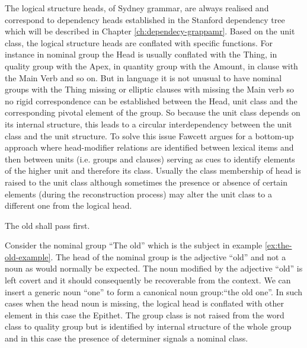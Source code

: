 The logical structure heads, of Sydney grammar, are always realised and correspond to dependency heads established in the Stanford dependency tree which will be described in Chapter \ref{ch:dependecy-grappamr}. Based on the unit class, the logical structure heads are conflated with specific functions. For instance in nominal group the Head is usually conflated with the Thing, in quality group with the Apex, in quantity group with the Amount, in clause with the Main Verb and so on. But in language it is not unusual to have nominal groups with the Thing missing or elliptic clauses with missing the Main verb so no rigid correspondence can be established between the Head, unit class and the corresponding pivotal element of the group. So because the unit class depends on its internal structure, this leads to a circular interdependency between the unit class and the unit structure. To solve this issue Fawcett argues for a bottom-up approach where head-modifier relations are identified between lexical items and then between units (i.e. groups and clauses) serving as cues to identify elements of the higher unit and therefore its class. Usually the class membership of head is raised to the unit class although sometimes the presence or absence of certain elements (during the reconstruction process) may alter the unit class to a different one from the logical head. 

\begin{exe}
	\ex\label{ex:the-old-example} The old shall pass first.
\end{exe}

Consider the nominal group ``The old'' which is the subject in example \ref{ex:the-old-example}. The head of the nominal group is the adjective ``old'' and not a noun as would normally be expected. The noun modified by the adjective ``old'' is left covert and it should consequently be recoverable from the context. We can insert a generic noun ``one'' to form a canonical noun group:``the old one''. In such cases when the head noun is missing, the logical head is conflated with other element in this case the Epithet. The group class is not raised from the word class to quality group but is identified by internal structure  of the whole group and in this case the presence of determiner signals a nominal class. 

